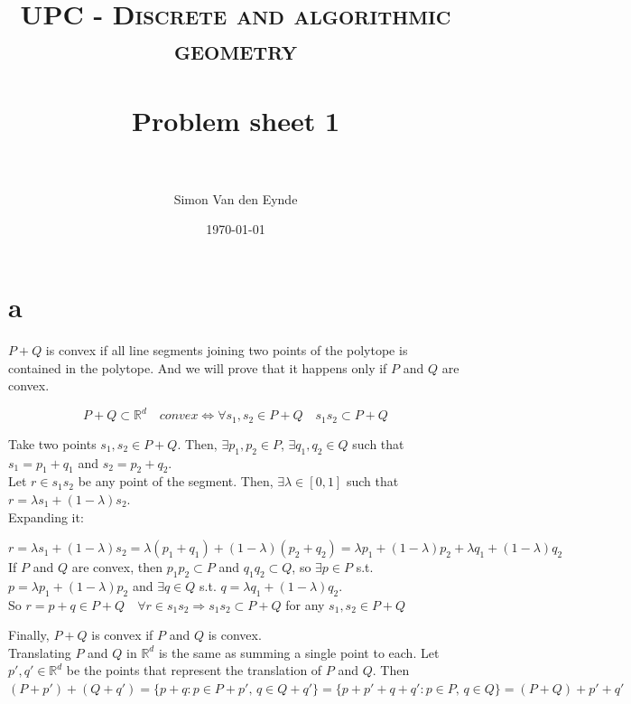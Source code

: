 \documentclass[paper=a4, fontsize=11pt]{scrartcl} %
\title{	
\normalfont \normalsize 
\textsc{UPC - Discrete and algorithmic geometry} \\ [25pt] %
\horrule{0.5pt} \\[0.4cm] %
\huge Problem sheet 1  \\ %
\horrule{2pt} \\[0.5cm] %
}
\author{Simon Van den Eynde} %
\date{\normalsize\today} %
\theoremstyle{plain}
\begin{document}
\maketitle %

\section{a}
$P+Q$ is convex if all line segments joining two points of the polytope is contained in the polytope. And we will prove that it happens only if $P$ and $Q$ are convex.

$$P+Q\subset \mathbb{R}^d \quad convex \Longleftrightarrow \forall s_1,s_2 \in P+Q \quad s_1 s_2 \subset P+Q$$

Take two points $s_1,s_2\in P+Q$. Then, $\exists p_1,p_2 \!\! \in \!\! P$, $\exists q_1,q_2 \!\! \in \!\! Q$ such that $s_1 = p_1 + q_1$ and $s_2= p_2 + q_2$.\\

Let $r\in s_1 s_2$ be any point of the segment. Then, $\exists \lambda \in [0,1]$ such that $r = \lambda s_1 + \left( 1 - \lambda \right) s_2$.\\

Expanding it:

$r = \lambda s_1 + \left( 1 - \lambda \right) s_2 = \lambda \left(p_1 + q_1 \right) + \left( 1 - \lambda \right) \left( p_2 + q_2 \right) = \lambda p_1 + \left( 1 - \lambda \right) p_2 + \lambda q_1 + \left( 1 - \lambda \right) q_2$\\

If $P$ and $Q$ are convex, then $p_1p_2 \subset P$ and $q_1q_2 \subset Q$, so $\exists p \!\! \in \!\! P$ s.t. $p = \lambda p_1 + \left( 1 - \lambda \right) p_2$ and $\exists q \!\! \in \!\! Q$ s.t. $q = \lambda q_1 + \left( 1 - \lambda \right) q_2$.\\

So $r = p + q \in P+Q \quad \forall r \in s_1s_2 \Longrightarrow s_1s_2 \subset P+Q$ for any $s_1,s_2 \in P+Q$

Finally, $P+Q$ is convex if $P$ and $Q$ is convex.\\

Translating $P$ and $Q$ in $\mathbb{R}^d$ is the same as summing a single point to each. Let $p',q' \in \mathbb{R}^d$ be the points that represent the translation of $P$ and $Q$. Then $(P+p') + (Q+q') = \{p + q : p\in P + p',\,q\in Q + q'\} = \{p + p' + q + q' : p\in P,\,q\in Q\} = (P+Q)+p'+q'$
\end{document}
